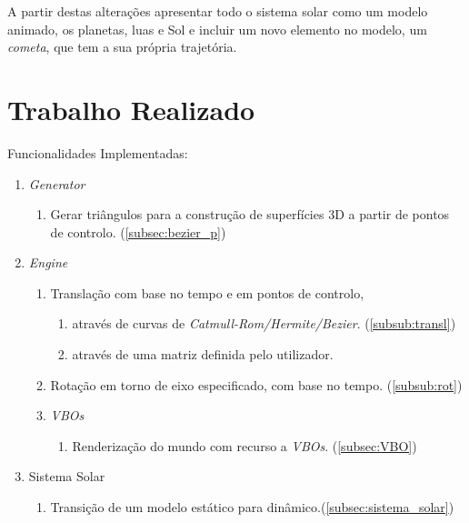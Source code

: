 \documentclass[runningheads]{llncs}
\begin{document}
    A partir destas alterações apresentar todo o sistema solar como um modelo animado, os planetas, luas e Sol e incluir um novo elemento no modelo, um \textit{cometa}, que tem a sua própria trajetória.
    
    \section{Trabalho Realizado}
    
    Funcionalidades Implementadas:
    
    \begin{enumerate}
        \item \textit{Generator}
        \begin{enumerate}
            \item Gerar triângulos para a construção de superfícies 3D a partir de pontos de controlo. (\ref{subsec:bezier_p})
        \end{enumerate}
        \item \textit{Engine}
        \begin{enumerate}
            \item Translação com base no tempo e em pontos de controlo, 
            \begin{enumerate}
                \item através de curvas de \textit{Catmull-Rom/Hermite/Bezier}. (\ref{subsub:transl})
                \item através de uma matriz definida pelo utilizador.
            \end{enumerate}
            \item Rotação em torno de eixo especificado, com base no tempo. (\ref{subsub:rot})
            \item \textit{VBOs} 
            \begin{enumerate}
                \item Renderização do mundo com recurso a \textit{VBOs}. (\ref{subsec:VBO})
            \end{enumerate}
        \end{enumerate}
        \item Sistema Solar 
        \begin{enumerate}
            \item Transição de um modelo estático para dinâmico.(\ref{subsec:sistema_solar})
        \end{enumerate}
    \end{enumerate}
    
    
    
    
    

    
\end{document}
